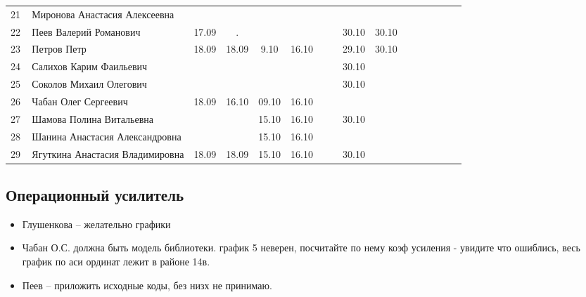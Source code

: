 \begin{tabular}{l|llccccccccccccc}
\midrule
21\,& Миронова Анастасия Алексеевна   \\
22\,& Пеев Валерий Романович          &17.09& .   &     &      &     &      &30.10&30.10\\
23\,& Петров Петр                     &18.09&18.09& 9.10&16.10 &     &      &29.10&30.10\\
24\,& Салихов Карим Фаильевич         &     &     &     &      &     &      &30.10&\\
25\,& Соколов Михаил Олегович         &     &     &     &      &     &      &30.10&\\
\midrule
26\,& Чабан Олег Сергеевич            &18.09&16.10&09.10&16.10\\
27\,& Шамова Полина Витальевна        &    &      &15.10&16.10 &     &      &30.10&\\
28\,& Шанина Анастасия Александровна  &    &      &15.10&16.10 &     &      &\\
29\,& Ягуткина Анастасия Владимировна &18.09&18.09&15.10&16.10 &     &      &30.10&\\
\bottomrule
\end{tabular}


\subsection*{Операционный усилитель}
\begin{itemize}
\item Глушенкова -- желательно графики
\item Чабан О.С. должна быть модель библиотеки. график 5 неверен, посчитайте по нему коэф усиления - увидите что ошиблись, весь график по аси ординат лежит в районе 14в.
\item Пеев  -- приложить исходные коды, без низх не принимаю.
\end{itemize}

